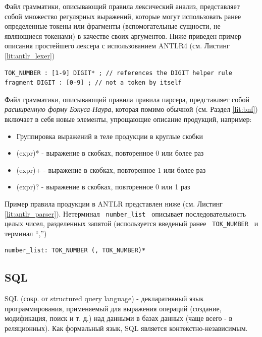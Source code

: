 Файл грамматики, описывающий правила лексический анализ, представляет собой множество регулярных выражений, которые могут использовать ранее определенные токены или фрагменты (вспомогательные сущности, не являющиеся токенами) в качестве своих аргументов. Ниже приведен пример описания простейшего лексера с использованием ANTLR4 (см. Листинг \ref{lit:antlr_lexer})

\begin{code}
\label{lit:antlr_lexer}
\begin{verbatim}
TOK_NUMBER : [1-9] DIGIT* ; // references the DIGIT helper rule
fragment DIGIT : [0-9] ; // not a token by itself
\end{verbatim}
\end{code}

Файл грамматики, описывающий правила правила парсера, представляет собой \textit{расширенную форму Бэкуса-Наура}, которая помимо обычной (см. Раздел \ref{lit:bnf}) включает в себя новые элементы, упрощающие описание продукций, например:

\begin{itemize}
    \item Группировка выражений в теле продукции в круглые скобки
    \item (expr)* - выражение в скобках, повторенное 0 или более раз
    \item (expr)+ - выражение в скобках, повторенное 1 или более раз
    \item (expr)? - выражение в скобках, повторенное 0 или 1 раз
\end{itemize}

Пример правила продукции в ANTLR представлен ниже (см. Листинг \ref{lit:antlr_parser}). Нетерминал \texttt{ number_list } описывает последовательность целых чисел, разделенных запятой (используется введеный ранее \texttt{ TOK_NUMBER } и терминал \enquote{,})

\begin{code}
\label{lit:antlr_parser}
\begin{verbatim}
number_list: TOK_NUMBER (, TOK_NUMBER)*
\end{verbatim}
\end{code}

\subsection{SQL} \label{lit:sql}
SQL (сокр. от structured query language) - декларативный язык программирования, применяемый для выражения операций (создание, модификация, поиск и т. д.) над данными в базах данных (чаще всего - в реляционных). Как формальный язык, SQL является контекстно-независимым.


